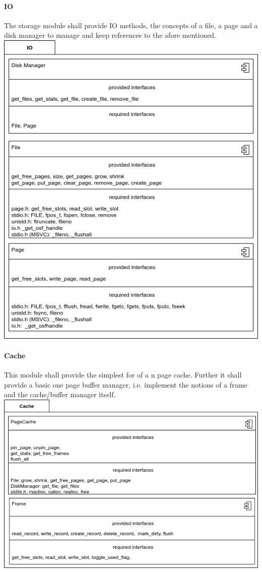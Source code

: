			\paragraph{IO}
				The storage module shall provide IO methods, the concepts of a file, a page and a disk manager to manage and keep references to the afore mentioned. \\
                \includegraphics[keepaspectratio, width=\textwidth]{img/io_arch.png} \\

			\paragraph{Cache}
				This module shall provide the simplest for of a n page cache.
				Further it shall provide a basic one page buffer manager, i.e. implement the notions of a frame and the cache/buffer manager itself.   \\
                \includegraphics[keepaspectratio, width=\textwidth]{img/cache_arch.png} \\

